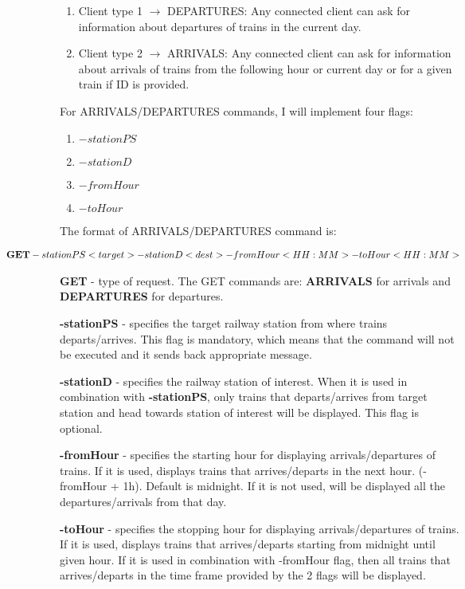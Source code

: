\documentclass[runningheads]{llncs}
\begin{document}
\begin{enumerate}
    \item Client type 1 $\rightarrow$ DEPARTURES: Any connected client can ask for information about departures of trains in the current day.
    \item Client type 2 $\rightarrow$ ARRIVALS: Any connected client can ask for information about arrivals of trains from the following hour or current day or for a given train if ID is provided.
\end{enumerate}

 For ARRIVALS/DEPARTURES commands, I will implement four flags: 
 \begin{enumerate}
        \item $-stationPS$
        \item $-stationD$
        \item $-fromHour$
        \item $-toHour$
 \end{enumerate}

The format of ARRIVALS/DEPARTURES command is:

\begin{gather*}
   \hspace*{-2cm}\textbf{GET} -stationPS <target> -stationD <dest> -fromHour <HH:MM> -toHour <HH:MM>
\end{gather*}

 \textbf{GET} - type of request. The GET commands are: \textbf{ARRIVALS} for arrivals and \textbf{DEPARTURES} for departures.
 
\textbf{-stationPS} - specifies the target railway station from where trains departs/arrives. This flag is mandatory, which means that the command will not be executed and it sends back appropriate message.

\textbf{-stationD} - specifies the railway station of interest. When it is used in combination with \textbf{-stationPS}, only trains that departs/arrives from target station and head towards station of interest will be displayed. This flag is optional.

\textbf{-fromHour} - specifies the starting hour for displaying arrivals/departures of trains. If it is used, displays trains that arrives/departs in the next hour. (-fromHour + 1h). Default is midnight. If it is not used, will be displayed all the departures/arrivals from that day.

\textbf{-toHour} - specifies the stopping hour for displaying arrivals/departures of trains. If it is used, displays trains that arrives/departs starting from midnight until given hour. If it is used in combination with -fromHour flag, then all trains that arrives/departs in the time frame provided by the 2 flags will be displayed.
\end{document}
